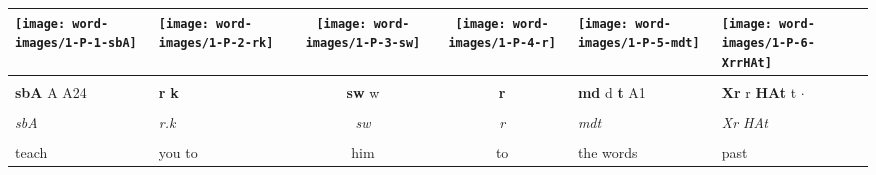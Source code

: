 \vspace{7.5mm}

\begin{tabularx}{\linewidth}{YYccYY}
	\hspace*{-2mm} \texttt{[image: word-images/1-P-1-sbA]} &
	\hspace*{-8mm} \texttt{[image: word-images/1-P-2-rk]} &
	\hspace*{-12mm} \texttt{[image: word-images/1-P-3-sw]} &
	\hspace*{-6mm} \texttt{[image: word-images/1-P-4-r]} &
	\hspace*{-6mm} \texttt{[image: word-images/1-P-5-mdt]} &
	\hspace*{-8mm} \texttt{[image: word-images/1-P-6-XrrHAt]} \\
	\hline \\ 
	\textbf{sbA} A A24 &
	\hspace*{-8mm}\textbf{r} \textbf{k} &
	\hspace*{-12mm}\textbf{sw} w &
	\hspace*{-4mm}\textbf{r} &
	\textbf{md} d \textbf{t} A1 &
	\textbf{Xr} r \textbf{HAt} t $\cdot$ \\
	\hline \\ 
	\textit{sbA} & \hspace*{-8mm}\textit{r.k} & \hspace*{-12mm}\textit{sw} & \hspace*{-4mm}\textit{r} & \textit{mdt} & \textit{Xr HAt} \\
	\hline \\ 
	teach & \hspace*{-10mm}you to & \hspace*{-12mm}him & \hspace*{-4mm}to & the words & past
\end{tabularx}

\vspace*{\fill}

\pagebreak

